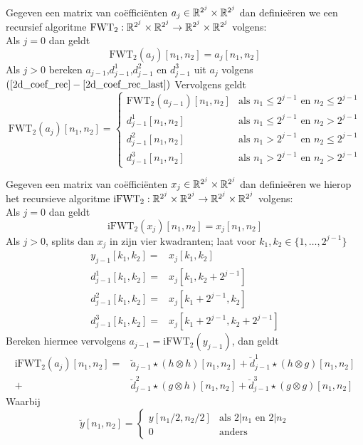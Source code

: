 \begin{algo}
  Gegeven een matrix van co\"effici\"enten $a_j\in\mathbb{R}^{2^j}\times\mathbb{R}^{2^j}$ dan definie\"eren
  we een recursief algoritme $\mathrm{FWT}_2:\mathbb{R}^{2^j}\times\mathbb{R}^{2^j}\to\mathbb{R}^{2^j}\times\mathbb{R}^{2^j}$
  volgens:\\
  Als $j=0$ dan geldt
  \[
  \mathrm{FWT}_2(a_j)[n_1,n_2] = a_j[n_1,n_2]
  \]
  Als $j>0$ bereken $a_{j-1}$,$d^1_{j-1}$,$d^2_{j-1}$ en $d^3_{j-1}$ uit $a_{j}$
  volgens $(\ref{2d_coef_rec}-\ref{2d_coef_rec_last})$
  Vervolgens geldt
  \begin{equation}
    \label{FWTd_def}
  \mathrm{FWT}_2(a_j)[n_1,n_2] = \begin{cases}
    \mathrm{FWT}_2(a_{j-1})[n_1,n_2] & \text{als } n_1 \leq 2^{j-1} \text{ en } n_2 \leq 2^{j-1}\\
    d^1_{j-1}[n_1,n_2]
    & \text{als } n_1\leq 2^{j-1} \text{ en } n_2>2^{j-1} \\
    d^2_{j-1}[n_1,n_2]
    & \text{als } n_1>2^{j-1} \text{ en } n_2\leq 2^{j-1} \\
    d^3_{j-1}[n_1,n_2] & \text{als } n_1>2^{j-1} \text{ en } n_2>2^{j-1} \end{cases}
  \end{equation}
\end{algo}
\begin{algo}
  Gegeven een matrix van  co\"effici\"enten $x_j\in\mathbb{R}^{2^j}\times\mathbb{R}^{2^j}$ dan definie\"eren we hierop het recursieve
  algoritme $\mathrm{iFWT}_2:\mathbb{R}^{2^j}\times\mathbb{R}^{2^j}\to\mathbb{R}^{2^j}\times\mathbb{R}^{2^j}$ volgens:\\
  Als $j=0$ dan geldt
  \[
  \mathrm{iFWT}_2(x_j)[n_1,n_2] = x_j[n_1,n_2]
  \]
  Als $j>0$, splits dan $x_j$ in zijn vier kwadranten; laat voor $k_1,k_2\in \{1,\ldots,2^{j-1}\}$
  \begin{eqnarray*}
    y_{j-1}[k_1,k_2]   =& x_j[k_1,k_2] \\
    d^1_{j-1}[k_1,k_2] =& x_j[k_1,k_2+2^{j-1}] \\
    d^2_{j-1}[k_1,k_2] =& x_j[k_1+2^{j-1},k_2] \\
    d^3_{j-1}[k_1,k_2] =& x_j[k_1+2^{j-1},k_2+2^{j-1}]
  \end{eqnarray*}
  Bereken hiermee vervolgens $a_{j-1} = \mathrm{iFWT}_2(y_{j-1})$,
  dan geldt
  \begin{equation}
    \label{iFWTd_def}
    \begin{split}
      \mathrm{iFWT}_2(a_j)[n_1,n_2] =& \breve{a}_{j-1} \star (h \otimes h)[n_1,n_2] 
      + \breve{d}_{j-1}^1 \star (h \otimes g)[n_1,n_2] \\
      +& \breve{d}_{j-1}^2 \star (g \otimes h)[n_1,n_2] 
      + \breve{d}_{j-1}^3 \star (g \otimes g)[n_1,n_2]
    \end{split}
  \end{equation}
  Waarbij 
  \[
  \breve y [n_1,n_2] = \begin{cases} 
    y[n_1/2,n_2/2] & \text{als } 2|n_1 \text{ en } 2|n_2 \\ 
    0 &\text{anders}\end{cases}
  \]
\end{algo}
